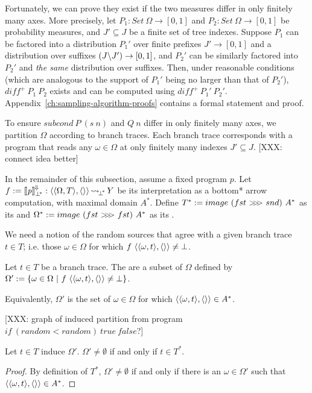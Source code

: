 Fortunately, we can prove they exist if the two measures differ in only finitely many axes.
More precisely, let $P_1 : Set~\Omega \to [0,1]$ and $P_2 : Set~\Omega \to [0,1]$ be probability measures, and $J' \subseteq J$ be a finite set of tree indexes.
Suppose $P_1$ can be factored into a distribution $P_1'$ over finite prefixes $J' \to [0,1]$ and a distribution over suffixes $(J \backslash J') \to [0,1]$, and $P_2'$ can be similarly factored into $P_2'$ and \emph{the same} distribution over suffixes.
Then, under reasonable conditions (which are analogous to the support of $P_1'$ being no larger than that of  $P_2'$), $diff^+~P_1~P_2$ exists and can be computed using $diff^+~P_1'~P_2'$.
Appendix~\ref{ch:sampling-algorithm-proofs} contains a formal statement and proof.

To ensure $subcond~P~(s~n)$ and $Q~n$ differ in only finitely many axes, we partition $\Omega$ according to branch traces.
Each branch trace corresponds with a program that reads any $\omega \in \Omega$ at only finitely many indexes $J' \subseteq J$.
[XXX: connect idea better]

In the remainder of this subsection, assume a fixed program $\mathit{p}$. Let $f := \left\llbracket{\mathit{p}}\right\rrbracket^{\mspace{-2mu}\Downarrow\mspace{-2mu}}_{\bot^{\mspace{-4mu}*}} : \langle{\langle{\Omega,T}\rangle,\langle{}\rangle}\rangle \operatorname{\rightsquigarrow_{\mspace{-3mu}{\bot^{\mspace{-4mu}*}}}} Y$ be its interpretation as a bottom* arrow computation, with maximal domain $A^*$.
Define $T^* := image~(fst~{>}\mspace{-6mu}{>}\mspace{-6mu}{>}~snd)~A^*$ as its  and
$\Omega^* := image~(fst~{>}\mspace{-6mu}{>}\mspace{-6mu}{>}~fst)~A^*$ as its .

We need a notion of the random sources that agree with a given branch trace $t \in T$; i.e. those $\omega \in \Omega$ for which $f~\langle{\langle{\omega,t}\rangle,\langle{}\rangle}\rangle \neq \bot$.

\begin{definition}
\label{def:induced-random-sources}
Let $t \in T$ be a branch trace. The  are a subset of $\Omega$ defined by
$\Omega' := \lbrace {\omega \in \Omega} \ \lvert\ {f~\langle{\langle{\omega,t}\rangle,\langle{}\rangle}\rangle \neq \bot} \rbrace$.
\end{definition}

Equivalently, $\Omega'$ is the set of $\omega \in \Omega$ for which $\langle{\langle{\omega,t}\rangle,\langle{}\rangle}\rangle \in A^*$.

[XXX: graph of induced partition from program $if~(random < random)~true~false$?]

\begin{theorem}
\label{thm:t-max-induce-nonempty}
Let $t \in T$ induce $\Omega'$. $\Omega' \neq \emptyset$ if and only if $t \in T^*$.
\end{theorem}
\begin{proof}
By definition of $T^*$, $\Omega' \neq \emptyset$ if and only if there is an $\omega \in \Omega'$ such that $\langle{\langle{\omega,t}\rangle,\langle{}\rangle}\rangle \in  A^*$.
\end{proof}

